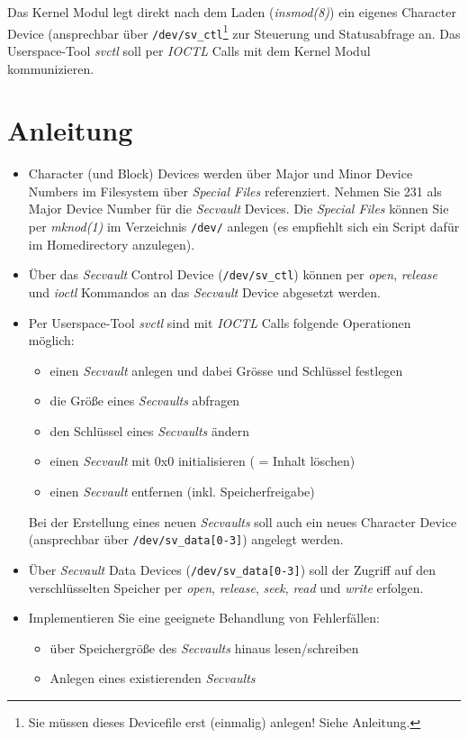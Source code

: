 \documentclass{article}
\begin{document}
Das Kernel Modul legt direkt nach dem Laden (\emph{insmod(8)}) ein eigenes Character Device (ansprechbar {\"u}ber \verb|/dev/sv_ctl|\footnote{Sie m{\"u}ssen dieses Devicefile erst (einmalig) anlegen! Siehe Anleitung.} zur Steuerung und Statusabfrage an.
Das Userspace-Tool \emph{svctl} soll per \emph{IOCTL} Calls mit dem Kernel Modul kommunizieren.

\section*{Anleitung}
\begin{itemize}
\item Character (und Block) Devices werden {\"u}ber Major und Minor
  Device Numbers im Filesystem {\"u}ber \emph{Special Files}
  referenziert. Nehmen Sie 231 als Major Device Number f{\"u}r die
  \emph{Secvault} Devices. Die \emph{Special Files} k{\"o}nnen Sie per
  \emph{mknod(1)} im Verzeichnis \verb|/dev/| anlegen (es empfiehlt
  sich ein Script daf{\"u}r im Homedirectory anzulegen).
\item {\"U}ber das \emph{Secvault} Control Device (\verb|/dev/sv_ctl|)
  k{\"o}nnen per \emph{open}, \emph{release} und \emph{ioctl}
  Kommandos an das \emph{Secvault} Device abgesetzt werden.
\item Per Userspace-Tool \emph{svctl} sind mit \emph{IOCTL} Calls
  folgende Operationen m{\"o}glich:
\begin{itemize}
\item einen \emph{Secvault} anlegen und dabei Gr{\"o}sse und Schl{\"u}ssel
  festlegen
\item die Gr{\"o}{\ss}e eines \emph{Secvaults} abfragen
\item den Schl{\"u}ssel eines \emph{Secvaults} {\"a}ndern
\item einen \emph{Secvault} mit 0x0 initialisieren ( = Inhalt l{\"o}schen)
\item einen \emph{Secvault} entfernen (inkl. Speicherfreigabe)
\end{itemize}
Bei der Erstellung eines neuen \emph{Secvaults} soll auch ein neues
Character Device (ansprechbar {\"u}ber \verb|/dev/sv_data[0-3]|)
angelegt werden.
\item {\"U}ber \emph{Secvault} Data Devices (\verb|/dev/sv_data[0-3]|)
  soll der Zugriff auf den verschl{\"u}sselten Speicher per
  \emph{open}, \emph{release}, \emph{seek}, \emph{read} und
  \emph{write} erfolgen.
\item Implementieren Sie eine geeignete Behandlung von
  Fehlerf{\"a}llen:
\begin{itemize}
\item {\"u}ber Speichergr{\"o}{\ss}e des \emph{Secvaults} hinaus
  lesen/schreiben
\item Anlegen eines existierenden \emph{Secvaults}
\end{itemize}
\end{itemize}
\end{document}
